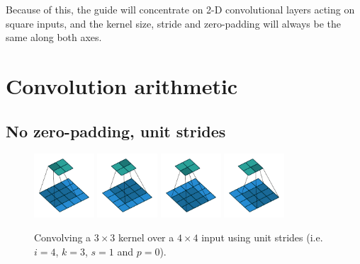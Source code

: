 \documentclass{article}
\begin{document}
Because of this, the guide will concentrate on 2-D convolutional layers acting
on square inputs, and the kernel size, stride and zero-padding will always be
the same along both axes.

\newpage
\section{Convolution arithmetic}

\subsection{No zero-padding, unit strides}

\begin{figure}[h]
    \centering
    \includegraphics[width=0.2\textwidth]{pdf/no_padding_no_strides_00.pdf}
    \includegraphics[width=0.2\textwidth]{pdf/no_padding_no_strides_01.pdf}
    \includegraphics[width=0.2\textwidth]{pdf/no_padding_no_strides_02.pdf}
    \includegraphics[width=0.2\textwidth]{pdf/no_padding_no_strides_03.pdf}
    \caption{\label{fig:no_padding_no_strides} Convolving a $3 \times 3$ kernel
        over a $4 \times 4$ input using unit strides (i.e. $i = 4$, $k = 3$,
        $s = 1$ and $p = 0$).}
\end{figure}
\end{document}
